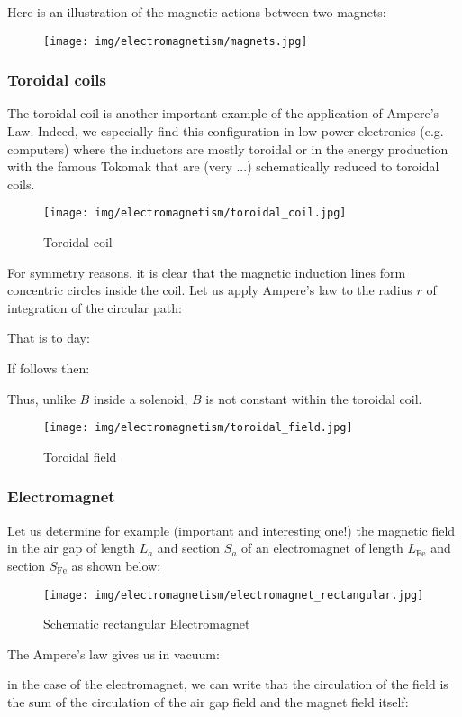 	Here is an illustration of the magnetic actions between two magnets:
	\begin{figure}[H]
		\centering
		\texttt{[image: img/electromagnetism/magnets.jpg]}
	\end{figure}
	
	\pagebreak
	\subsubsection{Toroidal coils}
	The toroidal coil is another important example of the application of Ampere's Law. Indeed, we especially find this configuration in low power electronics (e.g. computers) where the inductors are mostly toroidal or in the energy production with the famous Tokomak that are (very ...) schematically reduced to toroidal coils.
	\begin{figure}[H]
		\centering
		\texttt{[image: img/electromagnetism/toroidal\_coil.jpg]}
		\caption{Toroidal coil}
	\end{figure}
	For symmetry reasons, it is clear that the magnetic induction lines form concentric circles inside the coil. Let us apply Ampere's law to the radius $r$ of integration of the circular path:
	
	That is to day:
	
	If follows then:
	
	Thus, unlike $B$ inside a solenoid, $B$ is not constant within the toroidal coil.
	\begin{figure}[H]
		\centering
		\texttt{[image: img/electromagnetism/toroidal\_field.jpg]}
		\caption{Toroidal field}
	\end{figure}
	
	\pagebreak
	\subsubsection{Electromagnet}
	Let us determine for example (important and interesting one!) the magnetic field in the air gap of length $L_a$ and section $S_a$ of an electromagnet of length $L_{\text{Fe}}$ and section $S_{\text{Fe}}$ as shown below:
	\begin{figure}[H]
		\centering
		\texttt{[image: img/electromagnetism/electromagnet\_rectangular.jpg]}
		\caption{Schematic rectangular Electromagnet}
	\end{figure}
	The Ampere's law gives us in vacuum:
	
	in the case of the electromagnet, we can write that the circulation of the field is the sum of the circulation of the air gap field and the magnet field itself:
	
